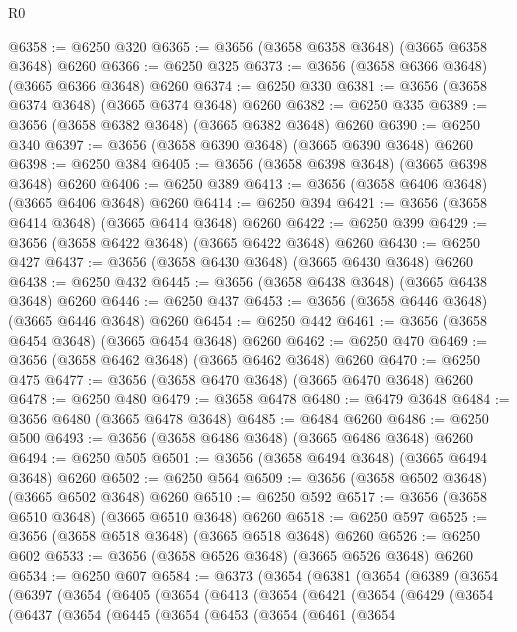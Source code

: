 \begin{lexlean}{R0}
\begin{coremodule}
@6358 := @6250 @320
@6365 := @3656 (@3658 @6358 @3648) (@3665 @6358 @3648) @6260
@6366 := @6250 @325
@6373 := @3656 (@3658 @6366 @3648) (@3665 @6366 @3648) @6260
@6374 := @6250 @330
@6381 := @3656 (@3658 @6374 @3648) (@3665 @6374 @3648) @6260
@6382 := @6250 @335
@6389 := @3656 (@3658 @6382 @3648) (@3665 @6382 @3648) @6260
@6390 := @6250 @340
@6397 := @3656 (@3658 @6390 @3648) (@3665 @6390 @3648) @6260
@6398 := @6250 @384
@6405 := @3656 (@3658 @6398 @3648) (@3665 @6398 @3648) @6260
@6406 := @6250 @389
@6413 := @3656 (@3658 @6406 @3648) (@3665 @6406 @3648) @6260
@6414 := @6250 @394
@6421 := @3656 (@3658 @6414 @3648) (@3665 @6414 @3648) @6260
@6422 := @6250 @399
@6429 := @3656 (@3658 @6422 @3648) (@3665 @6422 @3648) @6260
@6430 := @6250 @427
@6437 := @3656 (@3658 @6430 @3648) (@3665 @6430 @3648) @6260
@6438 := @6250 @432
@6445 := @3656 (@3658 @6438 @3648) (@3665 @6438 @3648) @6260
@6446 := @6250 @437
@6453 := @3656 (@3658 @6446 @3648) (@3665 @6446 @3648) @6260
@6454 := @6250 @442
@6461 := @3656 (@3658 @6454 @3648) (@3665 @6454 @3648) @6260
@6462 := @6250 @470
@6469 := @3656 (@3658 @6462 @3648) (@3665 @6462 @3648) @6260
@6470 := @6250 @475
@6477 := @3656 (@3658 @6470 @3648) (@3665 @6470 @3648) @6260
@6478 := @6250 @480
@6479 := @3658 @6478
@6480 := @6479 @3648
@6484 := @3656 @6480 (@3665 @6478 @3648)
@6485 := @6484 @6260
@6486 := @6250 @500
@6493 := @3656 (@3658 @6486 @3648) (@3665 @6486 @3648) @6260
@6494 := @6250 @505
@6501 := @3656 (@3658 @6494 @3648) (@3665 @6494 @3648) @6260
@6502 := @6250 @564
@6509 := @3656 (@3658 @6502 @3648) (@3665 @6502 @3648) @6260
@6510 := @6250 @592
@6517 := @3656 (@3658 @6510 @3648) (@3665 @6510 @3648) @6260
@6518 := @6250 @597
@6525 := @3656 (@3658 @6518 @3648) (@3665 @6518 @3648) @6260
@6526 := @6250 @602
@6533 := @3656 (@3658 @6526 @3648) (@3665 @6526 @3648) @6260
@6534 := @6250 @607
@6584 := @6373
    (@3654
      (@6381
        (@3654
          (@6389
            (@3654
              (@6397
                (@3654
                  (@6405
                    (@3654
                      (@6413
                        (@3654
                          (@6421
                            (@3654
                              (@6429
                                (@3654
                                  (@6437
                                    (@3654
                                      (@6445
                                        (@3654
                                          (@6453
                                            (@3654
                                              (@6461
                                                (@3654

\end{coremodule}
\end{lexlean}
